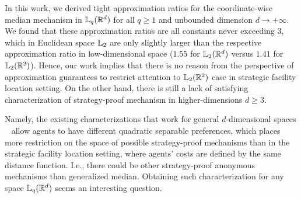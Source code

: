 
In this work, we derived tight approximation ratios for the coordinate-wise median mechanism in $\lqnorm(\reals^d)$ for all $q\ge 1$ and unbounded dimension $d\to+\infty$.
We found that these approximation ratios are all constants never exceeding $3$, which in Euclidean space $\lqnorm[2]$ are only slightly larger than the respective approximation ratio in low-dimensional space ($1.55$ for $\lqnorm[2](\reals^d)$ versus $1.41$ for $\lqnorm[2](\reals^2)$). Hence, our work implies that there is no reason from the perspective of approximation guarantees to restrict attention to $\lqnorm[2](\reals^2)$ case in strategic facility location setting. On the other hand, there is still a lack of satisfying characterization of strategy-proof mechanism in higher-dimensions $d\ge 3$.


Namely, the existing characterizations that work for general $d$-dimensional spaces ~\cite{border1983straightforward,peremans1997strategy} allow agents to have different  quadratic separable preferences, which places more restriction on the space of possible strategy-proof mechanisms than in the strategic facility location setting, where agents' costs are defined by the same distance function. I.e., there could be other strategy-proof anonymous mechanisms than generalized median. Obtaining such  characterization for any space $\lqnorm(\reals^d)$ seems an interesting question. 


